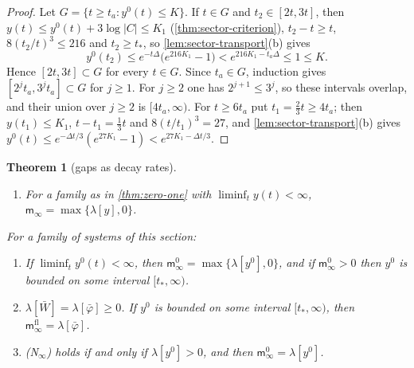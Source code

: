 \documentclass[11pt,a4paper]{amsart}
\newtheorem{theorem}{Theorem}[section]
\theoremstyle{definition}
\theoremstyle{remark}
\numberwithin{equation}{section}
\newcommand{\abs}[1]{\lvert #1\rvert}      %
\begin{document}
\begin{proof}
Let $G=\{t\ge t_a:y^0(t)\le K\}$. If $t\in G$ and $t_2\in[2t,3t]$, then $y(t)\le y^0(t)+3\log\abs{C}\le K_1$ (\cref{thm:sector-criterion}), $t_2-t\ge t$, $8(t_2/t)^3\le216$ and $t_2\ge t_*$, so \cref{lem:sector-transport}\textup{(b)} gives
\[
y^0(t_2)\le e^{-t\Delta}\bigl(e^{216K_1}-1\bigr)<e^{216K_1-t_a\Delta}\le1\le K .
\]
Hence $[2t,3t]\subset G$ for every $t\in G$. Since $t_a\in G$, induction gives $[2^jt_a,3^jt_a]\subset G$ for $j\ge1$. For $j\ge2$ one has $2^{j+1}\le3^j$, so these intervals overlap, and their union over $j\ge2$ is $[4t_a,\infty)$. For $t\ge6t_a$ put $t_1=\frac23t\ge4t_a$; then $y(t_1)\le K_1$, $t-t_1=\frac13t$ and $8(t/t_1)^3=27$, and \cref{lem:sector-transport}\textup{(b)} gives $y^0(t)\le e^{-\Delta t/3}(e^{27K_1}-1)<e^{27K_1-\Delta t/3}$.
\end{proof}

\begin{theorem}[gaps as decay rates]\label{thm:decay-rates}
\begin{enumerate}[label=\textup{(\alph*)},leftmargin=*]
\item For a family as in \cref{thm:zero-one} with $\liminf_ty(t)<\infty$, $\mathsf m_\infty=\max\{\lambda[y],0\}$.
\end{enumerate}
For a family of systems of this section:
\begin{enumerate}[label=\textup{(\alph*)},leftmargin=*,resume]
\item If $\liminf_ty^0(t)<\infty$, then $\mathsf m^0_\infty=\max\{\lambda[y^0],0\}$, and if $\mathsf m^0_\infty>0$ then $y^0$ is bounded on some interval $[t_*,\infty)$.
\item $\lambda[\bar W]=\lambda[\bar\varphi]\ge0$. If $y^0$ is bounded on some interval $[t_*,\infty)$, then $\mathsf m^{\mathrm{fl}}_\infty=\lambda[\bar\varphi]$.
\item \textup{(N$_\infty$)} holds if and only if $\lambda[y^0]>0$, and then $\mathsf m^0_\infty=\lambda[y^0]$.
\end{enumerate}
\end{theorem}
\end{document}
